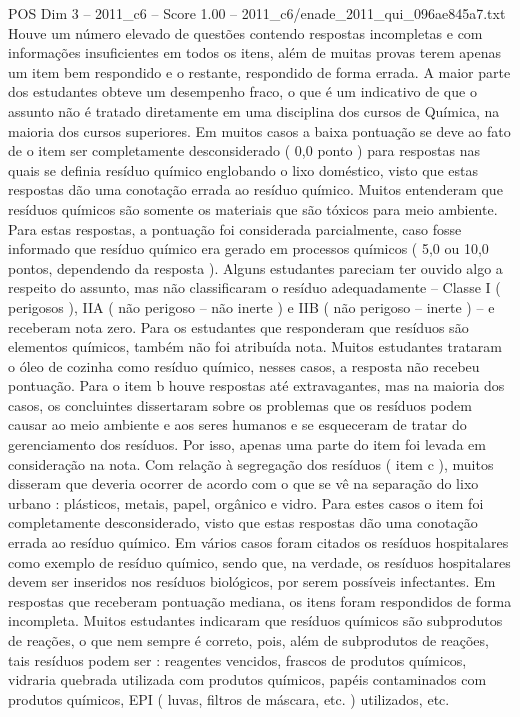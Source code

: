 \begin{textsample}{POS Dim 3 – 2011\_c6 – Score 1.00 – 2011\_c6/enade\_2011\_qui\_096ae845a7.txt}
Houve um número elevado de questões contendo respostas incompletas e com informações insuficientes em todos os itens, além de muitas provas terem apenas um item bem respondido e o restante, respondido de forma errada.
A maior parte dos estudantes obteve um desempenho fraco, o que é um indicativo de que o assunto não é tratado diretamente em uma disciplina dos cursos de Química, na maioria dos cursos superiores.
Em muitos casos a baixa pontuação se deve ao fato de o item ser completamente desconsiderado ( 0,0 ponto ) para respostas nas quais se definia resíduo químico englobando o lixo doméstico, visto que estas respostas dão uma conotação errada ao resíduo químico.
Muitos entenderam que resíduos químicos são somente os materiais que são tóxicos para meio ambiente.
Para estas respostas, a pontuação foi considerada parcialmente, caso fosse informado que resíduo químico era gerado em processos químicos ( 5,0 ou 10,0 pontos, dependendo da resposta ).
Alguns estudantes pareciam ter ouvido algo a respeito do assunto, mas não classificaram o resíduo adequadamente – Classe I ( perigosos ), IIA ( não perigoso – não inerte ) e IIB ( não perigoso – inerte ) – e receberam nota zero.
Para os estudantes que responderam que resíduos são elementos químicos, também não foi atribuída nota.
Muitos estudantes trataram o óleo de cozinha como resíduo químico, nesses casos, a resposta não recebeu pontuação.
Para o item b houve respostas até extravagantes, mas na maioria dos casos, os concluintes dissertaram sobre os problemas que os resíduos podem causar ao meio ambiente e aos seres humanos e se esqueceram de tratar do gerenciamento dos resíduos.
Por isso, apenas uma parte do item foi levada em consideração na nota.
Com relação à segregação dos resíduos ( item c ), muitos disseram que deveria ocorrer de acordo com o que se vê na separação do lixo urbano : plásticos, metais, papel, orgânico e vidro.
Para estes casos o item foi completamente desconsiderado, visto que estas respostas dão uma conotação errada ao resíduo químico.
Em vários casos foram citados os resíduos hospitalares como exemplo de resíduo químico, sendo que, na verdade, os resíduos hospitalares devem ser inseridos nos resíduos biológicos, por serem possíveis infectantes.
Em respostas que receberam pontuação mediana, os itens foram respondidos de forma incompleta.
Muitos estudantes indicaram que resíduos químicos são subprodutos de reações, o que nem sempre é correto, pois, além de subprodutos de reações, tais resíduos podem ser : reagentes vencidos, frascos de produtos químicos, vidraria quebrada utilizada com produtos químicos, papéis contaminados com produtos químicos, EPI ( luvas, filtros de máscara, etc. ) utilizados, etc.

\end{textsample}
